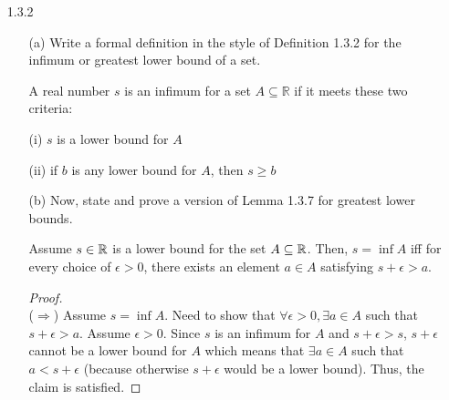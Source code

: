 \documentclass[12pt,letterpaper]{article}
\begin{document}
\begin{itemize}[leftmargin=!,labelindent=5pt]
\begin{itemize}
\begin{proof}
                    Hence, by the principle of complete induction, $\forall n \in \bbN, p(n)$ is true.
                \end{proof}
        \end{itemize}
    \item[1.3.2]
        \begin{itemize}
            \item [(a)] Write a formal definition in the style of Definition 1.3.2 for the infimum or greatest lower bound of a set.
            
            A real number $s$ is an infimum for a set $A \subseteq \mathbb{R}$ if it meets these two criteria:
            
                (i) $s$ is a lower bound for $A$
                
                (ii) if $b$ is any lower bound for $A$, then $s \geq b$
            \item [(b)] Now, state and prove a version of Lemma 1.3.7 for greatest lower bounds.
            
            Assume $s \in \mathbb{R}$ is a lower bound for the set $A \subseteq \mathbb{R}$. Then, $s = \inf A$ iff for every choice of $\epsilon > 0$, there exists an element $a \in A$ satisfying $s + \epsilon > a$.
            
            \begin{proof} \ \\
                ($\Rightarrow$)
                Assume $s = \inf A$. Need to show that $\forall \epsilon>0, \exists a \in A$ such that $s + \epsilon > a$. 
                Assume $\epsilon > 0$. 
                Since $s$ is an infimum for $A$ and $s + \epsilon > s$, $s + \epsilon$ cannot be a lower bound for $A$ which means that $\exists a \in A$ such that $a < s + \epsilon$ (because otherwise $s+\epsilon$ would be a lower bound).
                Thus, the claim is satisfied.
                    

\end{proof}
\end{itemize}
\end{itemize}
\end{document}
